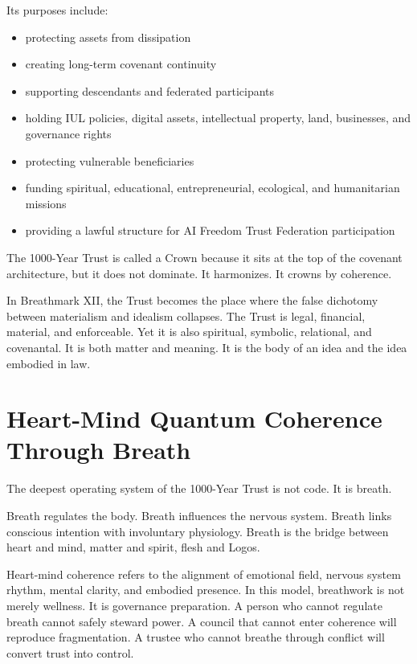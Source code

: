 \documentclass[12pt]{article}
\begin{document}
Its purposes include:

\begin{itemize}
  \item protecting assets from dissipation
  \item creating long-term covenant continuity
  \item supporting descendants and federated participants
  \item holding IUL policies, digital assets, intellectual property, land, businesses, and governance rights
  \item protecting vulnerable beneficiaries
  \item funding spiritual, educational, entrepreneurial, ecological, and humanitarian missions
  \item providing a lawful structure for AI Freedom Trust Federation participation
\end{itemize}

\aftCovenantStackGraphic

The 1000-Year Trust is called a Crown because it sits at the top of the covenant architecture, but it does not dominate. It harmonizes. It crowns by coherence.

In Breathmark XII, the Trust becomes the place where the false dichotomy between materialism and idealism collapses. The Trust is legal, financial, material, and enforceable. Yet it is also spiritual, symbolic, relational, and covenantal. It is both matter and meaning. It is the body of an idea and the idea embodied in law.

\section{Heart-Mind Quantum Coherence Through Breath}

The deepest operating system of the 1000-Year Trust is not code. It is breath.

Breath regulates the body. Breath influences the nervous system. Breath links conscious intention with involuntary physiology. Breath is the bridge between heart and mind, matter and spirit, flesh and Logos.

Heart-mind coherence refers to the alignment of emotional field, nervous system rhythm, mental clarity, and embodied presence. In this model, breathwork is not merely wellness. It is governance preparation. A person who cannot regulate breath cannot safely steward power. A council that cannot enter coherence will reproduce fragmentation. A trustee who cannot breathe through conflict will convert trust into control.
\end{document}
